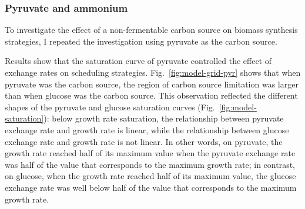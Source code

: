 \subsubsection{Pyruvate and ammonium}
\label{subsec:model-grid-pyruvate}

To investigate the effect of a non-fermentable carbon source on biomass synthesis strategies, I repeated the investigation using pyruvate as the carbon source. %

Results show that the saturation curve of pyruvate controlled the effect of exchange rates on scheduling strategies.
Fig.\ \ref{fig:model-grid-pyr} shows that when pyruvate was the carbon source, the region of carbon source limitation was larger than when glucose was the carbon source.
This observation reflected the different shapes of the pyruvate and glucose saturation curves (Fig.\ \ref{fig:model-saturation}): below growth rate saturation, the relationship between pyruvate exchange rate and growth rate is linear, while the relationship between glucose exchange rate and growth rate is not linear.
In other words, on pyruvate, the growth rate reached half of its maximum value when the pyruvate exchange rate was half of the value that corresponds to the maximum growth rate; in contrast, on glucose, when the growth rate reached half of its maximum value, the glucose exchange rate was well below half of the value that corresponds to the maximum growth rate.

